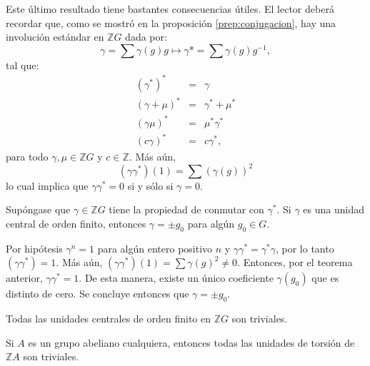 Este último resultado tiene bastantes consecuencias útiles. El lector \mbox{deberá} \mbox{recordar} que, como se mostró en la proposición \ref{prep:conjugacion}, hay una involución estándar en $\mathds{Z}G$ dada por: 
\begin{equation*}
\gamma = \sum\gamma(g)g \mapsto \gamma* = \sum\gamma(g)g^{-1},
\end{equation*}
tal que:
\begin{eqnarray*}
(\gamma^*)^* &=& \gamma \\
(\gamma + \mu)^* &=& \gamma^* + \mu^*\\
(\gamma\mu)^* &=& \mu^*\gamma^*\\
(c\gamma)^* &=& c\gamma^*,
\end{eqnarray*}
para todo $\gamma, \mu \in \mathds{Z}G$ y $c \in \mathds{Z}$. Más aún, 
\begin{equation*}
(\gamma\gamma^*)(1) = \sum(\gamma(g))^2
\end{equation*}
lo cual implica que $\gamma\gamma^* = 0 $ si y sólo si $\gamma = 0$.

\begin{corolario}
Supóngase que $\gamma \in \mathds{Z}G$ tiene la propiedad de conmutar con $\gamma^*$. Si $\gamma$ es una unidad central de orden finito, entonces $\gamma = \pm g_0$ para algún $g_0 \in G$.
\end{corolario}
\begin{proof*}
Por hipótesis $\gamma^n = 1$ para algún entero positivo $n$ y $\gamma\gamma^* = \gamma^*\gamma$, por lo tanto $(\gamma\gamma^*) = 1$. Más aún, $(\gamma\gamma^*)(1) = \sum \gamma(g)^2 \neq 0$. Entonces, por el teorema anterior, $\gamma\gamma^* = 1$. De esta manera, existe un único coeficiente $\gamma(g_0)$ que es distinto de cero. Se concluye entonces que $\gamma = \pm g_0$. 
\end{proof*}
\begin{corolario}
Todas las unidades centrales de orden finito en $\mathds{Z}G$ son triviales.
\end{corolario}
\begin{corolario}
Si $A$ es un grupo abeliano cualquiera, entonces todas las unidades de torsión de $\mathds{Z}A$ son triviales.
\end{corolario}

